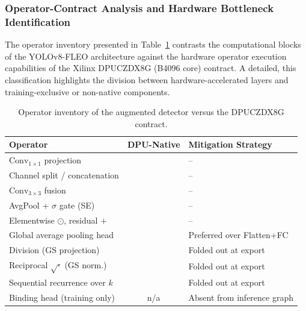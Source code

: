 \documentclass[algorithms,article,submit,moreauthors]{Definitions/mdpi}
\newcommand{\cmark}{\ding{51}}
\newcommand{\xmark}{\ding{55}}
\begin{document}
\subsubsection{Operator-Contract Analysis and Hardware Bottleneck Identification}\label{sec:compat}

The operator inventory presented in Table~\ref{tab:ops1} contrasts the computational blocks of the YOLOv8-FLEO architecture against the hardware operator execution capabilities of the Xilinx DPUCZDX8G (B4096 core) contract. A detailed, this classification highlights the division between hardware-accelerated layers and training-exclusive or non-native components.

\begin{table}[!h]
\centering
\caption{Operator inventory of the augmented detector versus the DPUCZDX8G contract.}
\label{tab:ops1}
\setlength{\tabcolsep}{5pt}
\renewcommand{\arraystretch}{1.2}
\begin{tabular}{lcl}
\toprule
Operator & DPU-Native & Mitigation Strategy \\
\midrule
$\mathrm{Conv}_{1\times1}$ projection & \cmark & -- \\
Channel split / concatenation & \cmark & -- \\
$\mathrm{Conv}_{3\times3}$ fusion & \cmark & -- \\
AvgPool + $\sigma$ gate (SE) & \cmark & -- \\
Elementwise $\odot$, residual $+$ & \cmark & -- \\
Global average pooling head & \cmark & Preferred over Flatten+FC \\
\midrule
Division (GS projection) & \xmark & Folded out at export\\
Reciprocal $\sqrt{\cdot}$ (GS norm.) & \xmark & Folded out at export  \\
Sequential recurrence over $k$ & \xmark & Folded out at export \\
Binding head (training only) & n/a & Absent from inference graph \\
\bottomrule
\end{tabular}
\end{table}
\end{document}
